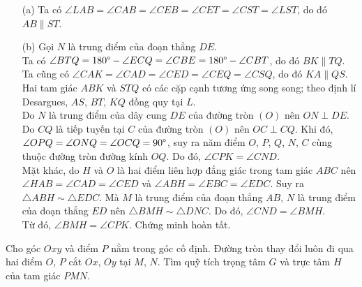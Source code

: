         \begin{solution}
            \hfill
            \begin{enumerate}
                \item[(a)] Ta có \(\angle LAB = \angle CAB = \angle CEB = \angle CET = \angle CST = \angle LST\), do đó \(AB \parallel ST\).
                \item[(b)] Gọi \(N\) là trung điểm của đoạn thẳng \(DE\).\\
                Ta có \(\angle BTQ = 180 \degree - \angle ECQ = \angle CBE = 180 \degree - \angle CBT\), do đó \(BK \parallel TQ\). Ta cũng có \(\angle CAK = \angle CAD = \angle CED = \angle CEQ = \angle CSQ\), do đó \(KA \parallel QS\). Hai tam giác \(ABK\) và \(STQ\) có các cặp cạnh tương ứng song song; theo định lí Desargues, \(AS\), \(BT\), \(KQ\) đồng quy tại \(L\).\\
                Do \(N\) là trung điểm của dây cung \(DE\) của đường tròn \((O)\) nên \(ON \perp DE\). Do \(CQ\) là tiếp tuyến tại \(C\) của đường tròn \((O)\) nên \(OC \perp CQ\). Khi đó, \(\angle OPQ = \angle ONQ = \angle OCQ = 90 \degree\), suy ra năm điểm \(O\), \(P\), \(Q\), \(N\), \(C\) cùng thuộc đường tròn đường kính \(OQ\). Do đó, \(\angle CPK = \angle CND\).\\
                Mặt khác, do \(H\) và \(O\) là hai điểm liên hợp đẳng giác trong tam giác \(ABC\) nên \(\angle HAB = \angle CAD = \angle CED\) và \(\angle ABH = \angle EBC = \angle EDC\). Suy ra \(\triangle ABH \sim \triangle EDC\). Mà \(M\) là trung điểm của đoạn thẳng \(AB\), \(N\) là trung điểm của đoạn thẳng \(ED\) nên \(\triangle BMH \sim \triangle DNC\). Do đó, \(\angle CND = \angle BMH\).\\
                Từ đó, \(\angle BMH = \angle CPK\). Chứng minh hoàn tất.
            \end{enumerate}
        \end{solution}

        \newpage

        \begin{problem}
            Cho góc \(Oxy\) và điểm \(P\) nằm trong góc cố định. Đường tròn thay đổi luôn đi qua hai điểm \(O\), \(P\) cắt \(Ox\), \(Oy\) tại \(M\), \(N\). Tìm quỹ tích trọng tâm \(G\) và trực tâm \(H\) của tam giác \(PMN\).
        \end{problem}

